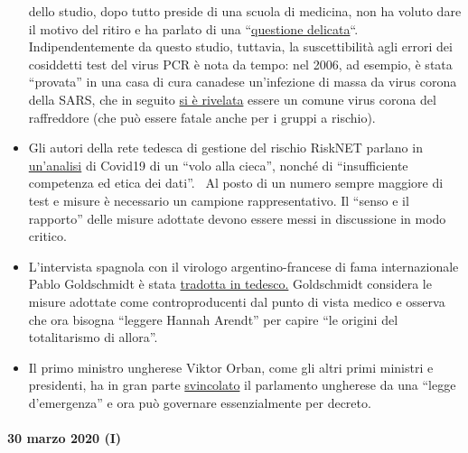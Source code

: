 \begin{itemize}
  dello studio, dopo tutto preside di una scuola di medicina, non ha
  voluto dare il motivo del ritiro e ha parlato di una
  ``\href{https://choice.npr.org/index.html?origin=https://www.npr.org/sections/health-shots/2020/03/26/822084429/in-defense-of-coronavirus-testing-strategy-administration-cited-retracted-study}{questione
  delicata}``. Indipendentemente da questo studio, tuttavia, la
  suscettibilità agli errori dei cosiddetti test del virus PCR è nota da
  tempo: nel 2006, ad esempio, è stata ``provata'' in una casa di cura
  canadese un'infezione di massa da virus corona della SARS, che in
  seguito
  \href{https://www.ncbi.nlm.nih.gov/pmc/articles/PMC2095096/}{si è
  rivelata} essere un comune virus corona del raffreddore (che può
  essere fatale anche per i gruppi a rischio).
\item
  Gli autori della rete tedesca di gestione del rischio RiskNET parlano
  in
  \href{https://www.risknet.de/themen/risknews/covid-19-und-der-blindflug/}{un'analisi}
  di Covid19 di un ``volo alla cieca'', nonché di ``insufficiente
  competenza ed etica dei dati''.~ Al posto di un numero sempre maggiore
  di test e misure è necessario un campione rappresentativo. Il ``senso
  e il rapporto'' delle misure adottate devono essere messi in
  discussione in modo critico.
\item
  L'intervista spagnola con il virologo argentino-francese di fama
  internazionale Pablo Goldschmidt è stata
  \href{https://www.rubikon.news/artikel/der-corona-totalitarismus}{tradotta
  in tedesco.} Goldschmidt considera le misure adottate come
  controproducenti dal punto di vista medico e osserva che ora bisogna
  ``leggere Hannah Arendt'' per capire ``le origini del totalitarismo di
  allora''.
\item
  Il primo ministro ungherese Viktor Orban, come gli altri primi
  ministri e presidenti, ha in gran parte
  \href{https://www.krone.at/2127086}{svincolato} il parlamento
  ungherese da una ``legge d'emergenza'' e ora può governare
  essenzialmente per decreto.
\end{itemize}

\hypertarget{30-marzo-2020-i}{%
\paragraph{30 marzo 2020 (I)}\label{30-marzo-2020-i}}

